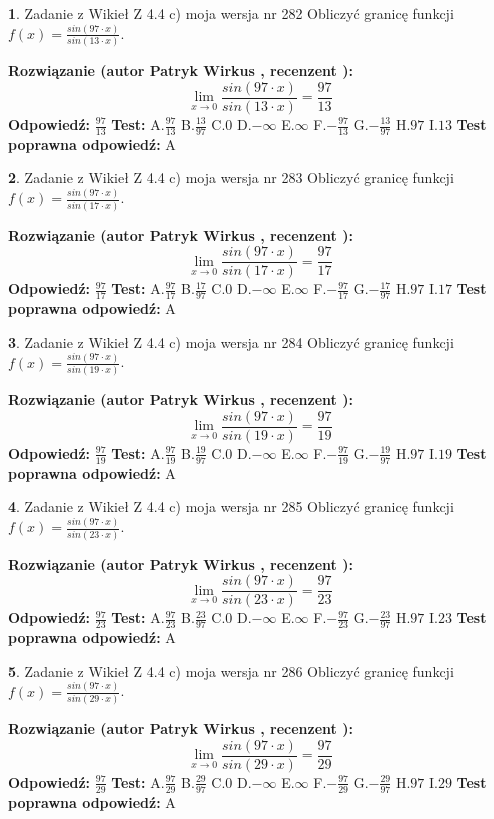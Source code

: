 \documentclass[12pt, a4paper]{article}
\theoremstyle{definition} %
\newtheorem{zad}{}
\newcommand{\zadStart}[1]{\begin{zad}#1\newline}
\newcommand{\zadStop}{\end{zad}}
\newcommand{\rozwStart}[2]{\noindent \textbf{Rozwiązanie (autor #1 , recenzent #2): }\newline}
\newcommand{\rozwStop}{\newline}
\newcommand{\odpStart}{\noindent \textbf{Odpowiedź:}\newline}
\newcommand{\odpStop}{\newline}
\newcommand{\testStart}{\noindent \textbf{Test:}\newline}
\newcommand{\testStop}{\newline}
\newcommand{\kluczStart}{\noindent \textbf{Test poprawna odpowiedź:}\newline}
\newcommand{\kluczStop}{\newline}
\begin{document}
\zadStart{Zadanie z Wikieł Z 4.4 c) moja wersja nr 282}
Obliczyć granicę funkcji $f(x)=\frac{sin(97\cdot x)}{sin(13\cdot x)}$.
\zadStop
\rozwStart{Patryk Wirkus}{}
$$\lim\limits_{x\to 0}\frac{sin(97\cdot x)}{sin(13\cdot x)}=
\frac{97}{13}$$
\rozwStop
\odpStart
$\frac{97}{13}$
\odpStop
\testStart
A.$\frac{97}{13}$
B.$\frac{13}{97}$
C.$0$
D.$-\infty$
E.$\infty$
F.$-\frac{97}{13}$
G.$-\frac{13}{97}$
H.$97$
I.$13$
\testStop
\kluczStart
A
\kluczStop



\zadStart{Zadanie z Wikieł Z 4.4 c) moja wersja nr 283}
Obliczyć granicę funkcji $f(x)=\frac{sin(97\cdot x)}{sin(17\cdot x)}$.
\zadStop
\rozwStart{Patryk Wirkus}{}
$$\lim\limits_{x\to 0}\frac{sin(97\cdot x)}{sin(17\cdot x)}=
\frac{97}{17}$$
\rozwStop
\odpStart
$\frac{97}{17}$
\odpStop
\testStart
A.$\frac{97}{17}$
B.$\frac{17}{97}$
C.$0$
D.$-\infty$
E.$\infty$
F.$-\frac{97}{17}$
G.$-\frac{17}{97}$
H.$97$
I.$17$
\testStop
\kluczStart
A
\kluczStop



\zadStart{Zadanie z Wikieł Z 4.4 c) moja wersja nr 284}
Obliczyć granicę funkcji $f(x)=\frac{sin(97\cdot x)}{sin(19\cdot x)}$.
\zadStop
\rozwStart{Patryk Wirkus}{}
$$\lim\limits_{x\to 0}\frac{sin(97\cdot x)}{sin(19\cdot x)}=
\frac{97}{19}$$
\rozwStop
\odpStart
$\frac{97}{19}$
\odpStop
\testStart
A.$\frac{97}{19}$
B.$\frac{19}{97}$
C.$0$
D.$-\infty$
E.$\infty$
F.$-\frac{97}{19}$
G.$-\frac{19}{97}$
H.$97$
I.$19$
\testStop
\kluczStart
A
\kluczStop



\zadStart{Zadanie z Wikieł Z 4.4 c) moja wersja nr 285}
Obliczyć granicę funkcji $f(x)=\frac{sin(97\cdot x)}{sin(23\cdot x)}$.
\zadStop
\rozwStart{Patryk Wirkus}{}
$$\lim\limits_{x\to 0}\frac{sin(97\cdot x)}{sin(23\cdot x)}=
\frac{97}{23}$$
\rozwStop
\odpStart
$\frac{97}{23}$
\odpStop
\testStart
A.$\frac{97}{23}$
B.$\frac{23}{97}$
C.$0$
D.$-\infty$
E.$\infty$
F.$-\frac{97}{23}$
G.$-\frac{23}{97}$
H.$97$
I.$23$
\testStop
\kluczStart
A
\kluczStop



\zadStart{Zadanie z Wikieł Z 4.4 c) moja wersja nr 286}
Obliczyć granicę funkcji $f(x)=\frac{sin(97\cdot x)}{sin(29\cdot x)}$.
\zadStop
\rozwStart{Patryk Wirkus}{}
$$\lim\limits_{x\to 0}\frac{sin(97\cdot x)}{sin(29\cdot x)}=
\frac{97}{29}$$
\rozwStop
\odpStart
$\frac{97}{29}$
\odpStop
\testStart
A.$\frac{97}{29}$
B.$\frac{29}{97}$
C.$0$
D.$-\infty$
E.$\infty$
F.$-\frac{97}{29}$
G.$-\frac{29}{97}$
H.$97$
I.$29$
\testStop
\kluczStart
A
\kluczStop
\end{document}
